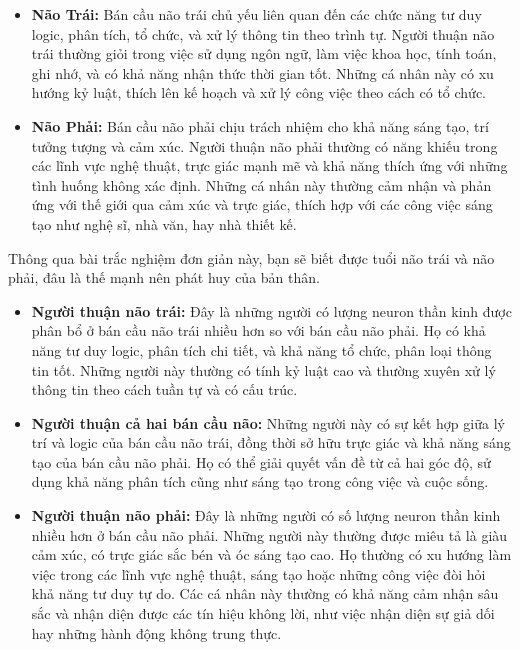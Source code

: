 \begin{itemize}
  \item \textbf{Não Trái:} Bán cầu não trái chủ yếu liên quan đến các chức năng tư duy logic, phân tích, tổ chức, và xử lý thông tin theo trình tự. Người thuận não trái thường giỏi trong việc sử dụng ngôn ngữ, làm việc khoa học, tính toán, ghi nhớ, và có khả năng nhận thức thời gian tốt. Những cá nhân này có xu hướng kỷ luật, thích lên kế hoạch và xử lý công việc theo cách có tổ chức.
  
  \item \textbf{Não Phải:} Bán cầu não phải chịu trách nhiệm cho khả năng sáng tạo, trí tưởng tượng và cảm xúc. Người thuận não phải thường có năng khiếu trong các lĩnh vực nghệ thuật, trực giác mạnh mẽ và khả năng thích ứng với những tình huống không xác định. Những cá nhân này thường cảm nhận và phản ứng với thế giới qua cảm xúc và trực giác, thích hợp với các công việc sáng tạo như nghệ sĩ, nhà văn, hay nhà thiết kế.
\end{itemize}

Thông qua bài trắc nghiệm đơn giản này, bạn sẽ biết được tuổi não trái và não phải, đâu là thế mạnh nên phát huy của bản thân.
\begin{itemize}
  \item \textbf{Người thuận não trái:} Đây là những người có lượng neuron thần kinh được phân bổ ở bán cầu não trái nhiều hơn so với bán cầu não phải. Họ có khả năng tư duy logic, phân tích chi tiết, và khả năng tổ chức, phân loại thông tin tốt. Những người này thường có tính kỷ luật cao và thường xuyên xử lý thông tin theo cách tuần tự và có cấu trúc.
  
  \item \textbf{Người thuận cả hai bán cầu não:} Những người này có sự kết hợp giữa lý trí và logic của bán cầu não trái, đồng thời sở hữu trực giác và khả năng sáng tạo của bán cầu não phải. Họ có thể giải quyết vấn đề từ cả hai góc độ, sử dụng khả năng phân tích cũng như sáng tạo trong công việc và cuộc sống.
  
  \item \textbf{Người thuận não phải:} Đây là những người có số lượng neuron thần kinh nhiều hơn ở bán cầu não phải. Những người này thường được miêu tả là giàu cảm xúc, có trực giác sắc bén và óc sáng tạo cao. Họ thường có xu hướng làm việc trong các lĩnh vực nghệ thuật, sáng tạo hoặc những công việc đòi hỏi khả năng tư duy tự do. Các cá nhân này thường có khả năng cảm nhận sâu sắc và nhận diện được các tín hiệu không lời, như việc nhận diện sự giả dối hay những hành động không trung thực.
\end{itemize}

